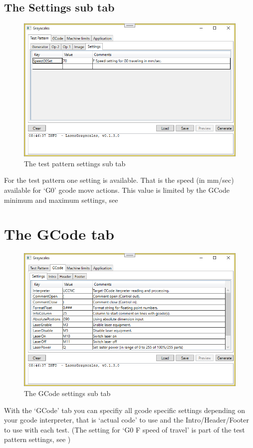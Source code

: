 \subsection{The Settings sub tab}\label{TestPatternSettingsTab}
\begin{figure}[h!]
    \centering
    \includegraphics[width=0.8\linewidth]{./images/Settings.png}
    \caption{The test pattern settings sub tab}
\end{figure}

For the test pattern one setting is available. That is the speed (in mm/sec) available for `G0' gcode move actions. This value is limited by the GCode minimum and maximum settings,
see 

\section{The GCode tab}\label{GCodeTab}
\begin{figure}[h!]
    \centering
    \includegraphics[width=0.8\linewidth]{./images/GCode-Settings.png}
    \caption{The GCode settings sub tab}
\end{figure}

With the `GCode' tab you can specifiy all gcode specific settings depending on your gcode interpreter, that is `actual code' to use and the Intro/Header/Footer to use with
each test. (The setting for `G0 F speed of travel' is part of the test pattern settings, see )

